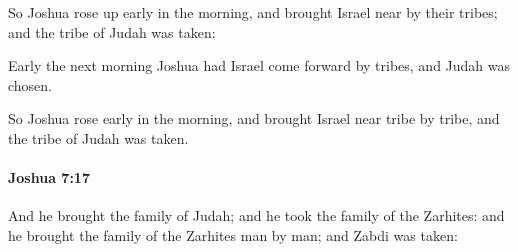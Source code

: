 			\begin{versebox}
					\item[BHS] 
					\item[ASV] So Joshua rose up early in the morning, and brought Israel near by their tribes; and the tribe of Judah was taken:
					\item[NIV] Early the next morning Joshua had Israel come forward by tribes, and Judah was chosen.
					\item[NRSV] So Joshua rose early in the morning, and brought Israel near tribe by tribe, and the tribe of Judah was taken.
			\end{versebox}

		\paragraph{Joshua 7:17} %
			\label{JOSHUA-7-17}

			And he brought the family of Judah; and he took the family of the Zarhites: and he brought the family of the Zarhites man by man; and Zabdi was taken:

